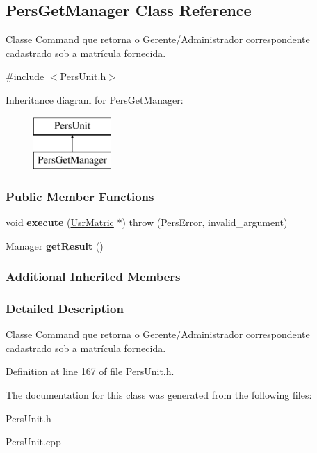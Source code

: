 \hypertarget{classPersGetManager}{\subsection{Pers\-Get\-Manager Class Reference}
\label{db/db6/classPersGetManager}
}


Classe Command que retorna o Gerente/\-Administrador correspondente cadastrado sob a matrícula fornecida.  




{\ttfamily \#include $<$Pers\-Unit.\-h$>$}

Inheritance diagram for Pers\-Get\-Manager\-:\begin{figure}[H]
\begin{center}
\leavevmode
\includegraphics[height=2.000000cm]{db/db6/classPersGetManager}
\end{center}
\end{figure}
\subsubsection*{Public Member Functions}
\begin{DoxyCompactItemize}
\item 
\hypertarget{classPersGetManager_a7bad813d5561b69e2e3dd902d28601d9}{void {\bfseries execute} (\hyperlink{classUsrMatric}{Usr\-Matric} $\ast$)  throw (\-Pers\-Error, invalid\-\_\-argument)}\label{db/db6/classPersGetManager_a7bad813d5561b69e2e3dd902d28601d9}

\item 
\hypertarget{classPersGetManager_aa1a22e73d1763f77871d75fea89b1224}{\hyperlink{classManager}{Manager} {\bfseries get\-Result} ()}\label{db/db6/classPersGetManager_aa1a22e73d1763f77871d75fea89b1224}

\end{DoxyCompactItemize}
\subsubsection*{Additional Inherited Members}


\subsubsection{Detailed Description}
Classe Command que retorna o Gerente/\-Administrador correspondente cadastrado sob a matrícula fornecida. 

Definition at line 167 of file Pers\-Unit.\-h.



The documentation for this class was generated from the following files\-:\begin{DoxyCompactItemize}
\item 
Pers\-Unit.\-h\item 
Pers\-Unit.\-cpp\end{DoxyCompactItemize}
